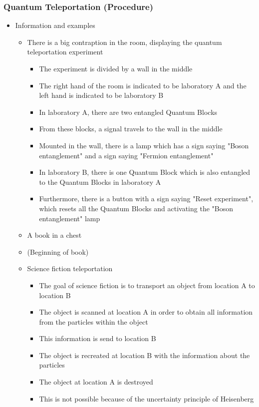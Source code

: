 \documentclass[11pt,twoside]{report} %
\begin{document}
\subsubsection{Quantum Teleportation (Procedure)}
\begin{itemize}
	\item Information and examples
	\begin{itemize}
		\item There is a big contraption in the room, displaying the quantum teleportation experiment
		\begin{itemize}
			\item The experiment is divided by a wall in the middle
			\item The right hand of the room is indicated to be laboratory A and the left hand is indicated to be laboratory B
			\item In laboratory A, there are two entangled Quantum Blocks
			\item From these blocks, a signal travels to the wall in the middle
			\item Mounted in the wall, there is a lamp which has a sign saying "Boson entanglement" and a sign saying "Fermion entanglement"
			\item In laboratory B, there is one Quantum Block which is also entangled to the Quantum Blocks in laboratory A
			\item Furthermore, there is a button with a sign saying "Reset experiment", which resets all the Quantum Blocks and activating the "Boson entanglement" lamp
		\end{itemize}
		\item A book in a chest
		\item (Beginning of book)
		\item Science fiction teleportation
		\begin{itemize}
			\item The goal of science fiction is to transport an object from location A to location B
			\item The object is scanned at location A in order to obtain all information from the particles within the object
			\item This information is send to location B
			\item The object is recreated at location B with the information about the particles
			\item The object at location A is destroyed
			\item This is not possible because of the uncertainty principle of Heisenberg

\end{itemize}
\end{itemize}
\end{itemize}
\end{document}
